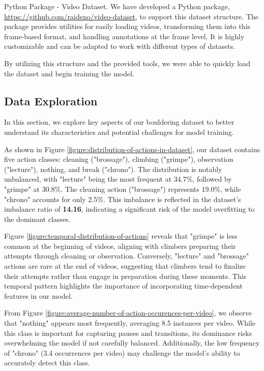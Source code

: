 \begin{AIbox}{Python Package - Video Dataset.}
  We have developed a Python package, \href{https://github.com/raideno/video-dataset}{https://github.com/raideno/video-dataset}, to support this dataset structure. The package provides utilities for easily loading videos, transforming them into this frame-based format, and handling annotations at the frame level. It is highly customizable and can be adapted to work with different types of datasets.
\end{AIbox}

By utilizing this structure and the provided tools, we were able to quickly load the dataset and begin training the model.

\subsection{Data Exploration}  
In this section, we explore key aspects of our bouldering dataset to better understand its characteristics and potential challenges for model training.



As shown in Figure \ref{figure:distribution-of-actions-in-dataset}, our dataset contains five action classes: cleaning ("brossage"), climbing ("grimpe"), observation ("lecture"), nothing, and break ("chrono"). The distribution is notably unbalanced, with "lecture" being the most frequent at 34.7\%, followed by "grimpe" at 30.8\%. The cleaning action ("brossage") represents 19.0\%, while "chrono" accounts for only 2.5\%. This imbalance is reflected in the dataset's imbalance ratio of \textbf{14.16}, indicating a significant risk of the model overfitting to the dominant classes.

Figure \ref{figure:temporal-distribution-of-actions} reveals that "grimpe" is less common at the beginning of videos, aligning with climbers preparing their attempts through cleaning or observation. Conversely, "lecture" and "brossage" actions are rare at the end of videos, suggesting that climbers tend to finalize their attempts rather than engage in preparation during these moments. This temporal pattern highlights the importance of incorporating time-dependent features in our model.

From Figure \ref{figure:average-number-of-action-occurences-per-video}, we observe that "nothing" appears most frequently, averaging 8.5 instances per video. While this class is important for capturing pauses and transitions, its dominance risks overwhelming the model if not carefully balanced. Additionally, the low frequency of "chrono" (3.4 occurrences per video) may challenge the model's ability to accurately detect this class.

